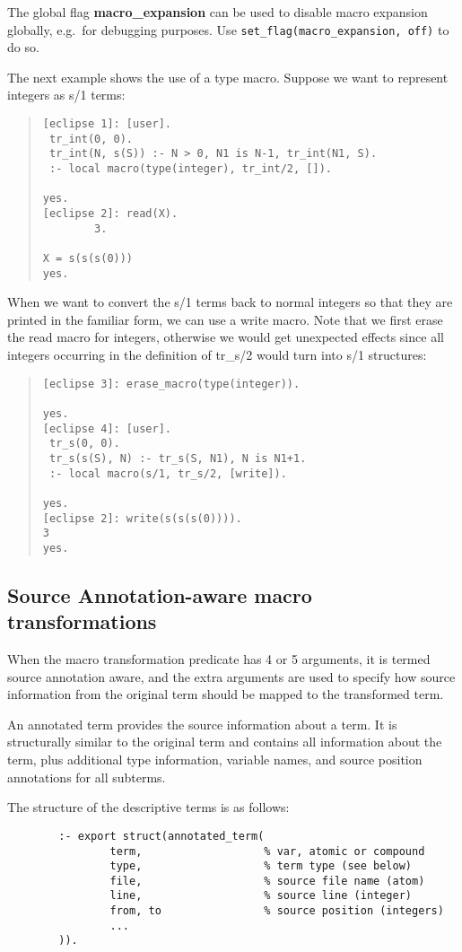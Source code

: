 The global flag {\bf macro_expansion} can be used to disable
macro expansion globally, e.g.\ for debugging purposes.
Use {\tt set_flag(macro_expansion, off)} to do so.

The next example shows the use of a type macro. Suppose we want to represent
integers as s/1 terms:
\begin{quote} \begin{verbatim}
[eclipse 1]: [user].
 tr_int(0, 0).
 tr_int(N, s(S)) :- N > 0, N1 is N-1, tr_int(N1, S).
 :- local macro(type(integer), tr_int/2, []).

yes.
[eclipse 2]: read(X).
        3.

X = s(s(s(0)))
yes.
\end{verbatim} \end{quote}
When we want to convert the s/1 terms back to normal integers so that they
are printed in the familiar form, we can use a write macro.
Note that we first erase the read macro for integers, otherwise we would get
unexpected effects since all integers occurring in the definition of
tr_s/2 would turn into s/1 structures:
\begin{quote} \begin{verbatim}
[eclipse 3]: erase_macro(type(integer)).

yes.
[eclipse 4]: [user].
 tr_s(0, 0).
 tr_s(s(S), N) :- tr_s(S, N1), N is N1+1.
 :- local macro(s/1, tr_s/2, [write]).

yes.
[eclipse 2]: write(s(s(s(0)))).
3
yes.
\end{verbatim} \end{quote}

\subsection{Source Annotation-aware macro transformations}
\label{annotated}
When the macro transformation predicate has 4 or 5 arguments, it is termed
source annotation aware, and the extra
arguments are used to specify how source information from the 
original term should be mapped to the transformed term.

An annotated term provides the source information about a term. It
is structurally similar to the original term and
contains all information about the term, plus additional type information,
variable names, and source position annotations for all subterms.

The structure of the descriptive terms is as follows:

\begin{verbatim}    
        :- export struct(annotated_term(
                term,                   % var, atomic or compound
                type,                   % term type (see below)
                file,                   % source file name (atom)
                line,                   % source line (integer)
                from, to                % source position (integers)
                ...
        )).
\end{verbatim}    

